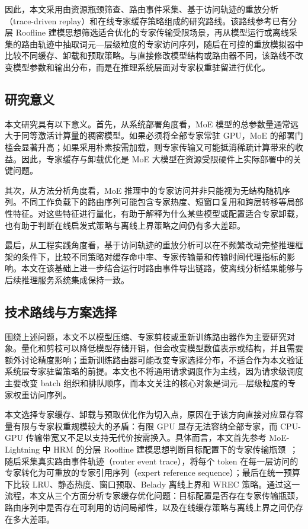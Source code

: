 因此，本文采用由资源瓶颈筛查、路由事件采集、基于访问轨迹的重放分析（trace-driven replay）和在线专家缓存策略组成的研究路线。该路线参考已有分层 Roofline 建模思想筛选适合优化的专家传输受限场景，再从模型运行或离线采集的路由轨迹中抽取词元—层级粒度的专家访问序列，随后在可控的重放模拟器中比较不同缓存、卸载和预取策略。与直接修改模型结构或路由器不同，该路线不改变模型参数和输出分布，而是在推理系统层面对专家权重驻留进行优化。

\subsection{研究意义}

本文研究具有以下意义。首先，从系统部署角度看，MoE 模型的总参数量通常远大于同等激活计算量的稠密模型。如果必须将全部专家常驻 GPU，MoE 的部署门槛会显著升高；如果采用朴素按需加载，则专家传输又可能抵消稀疏计算带来的收益。因此，专家缓存与卸载优化是 MoE 大模型在资源受限硬件上实际部署中的关键问题。

其次，从方法分析角度看，MoE 推理中的专家访问并非只能视为无结构随机序列。不同工作负载下的路由序列可能包含专家热度、短窗口复用和跨层转移等局部性特征。对这些特征进行量化，有助于解释为什么某些模型或配置适合专家卸载，也有助于判断在线启发式策略与离线上界策略之间仍有多大差距。

最后，从工程实践角度看，基于访问轨迹的重放分析可以在不频繁改动完整推理框架的条件下，比较不同策略对缓存命中率、专家传输量和传输时间代理指标的影响。本文在该基础上进一步结合运行时路由事件导出链路，使离线分析结果能够与后续推理服务系统集成保持一致。

\subsection{技术路线与方案选择}

围绕上述问题，本文不以模型压缩、专家剪枝或重新训练路由器作为主要研究对象。量化和剪枝可以降低模型存储开销，但会改变模型数值表示或结构，并且需要额外讨论精度影响；重新训练路由器可能改变专家选择分布，不适合作为本文验证系统层专家驻留策略的前提。本文也不将通用请求调度作为主线，因为请求级调度主要改变 batch 组织和排队顺序，而本文关注的核心对象是词元—层级粒度的专家权重访问序列。

本文选择专家缓存、卸载与预取优化作为切入点，原因在于该方向直接对应显存容量有限与专家权重规模较大的矛盾：有限 GPU 显存无法容纳全部专家，而 CPU-GPU 传输带宽又不足以支持无代价按需换入。具体而言，本文首先参考 MoE-Lightning 中 HRM 的分层 Roofline 建模思想判断目标配置下的专家传输瓶颈~\cite{cao2025moelightning}；随后采集真实路由事件轨迹（router event trace），将每个 token 在每一层访问的专家转化为可重放的专家引用序列（expert reference sequence）；最后在统一预算下比较 LRU、静态热度、窗口预取、Belady 离线上界和 WREC 策略。通过这一流程，本文从三个方面分析专家缓存优化问题：目标配置是否存在专家传输瓶颈，路由序列中是否存在可利用的访问局部性，以及在线缓存策略与离线上界之间仍存在多大差距。


